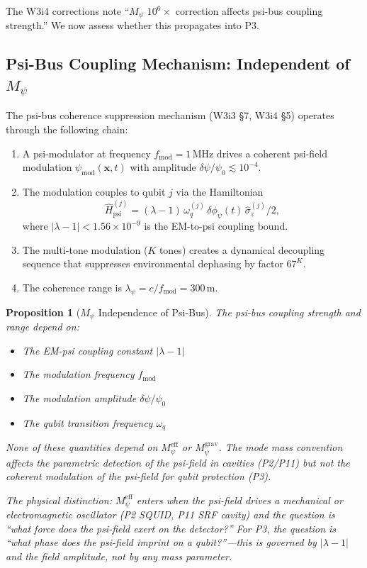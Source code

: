 \documentclass[11pt]{article}
\newtheorem{proposition}[theorem]{Proposition}
\theoremstyle{definition}
\theoremstyle{remark}
\begin{document}
The W3i4 corrections note ``$M_\psi$ $10^6\times$ correction affects psi-bus
coupling strength.''  We now assess whether this propagates into P3.

\subsection{Psi-Bus Coupling Mechanism: Independent of $M_\psi$}
\label{sec:coupling-mechanism}

The psi-bus coherence suppression mechanism (W3i3 \S7, W3i4 \S5) operates
through the following chain:

\begin{enumerate}
  \item A psi-modulator at frequency $f_{\mathrm{mod}} = 1$\,MHz drives a
    coherent psi-field modulation $\psi_{\mathrm{mod}}(\mathbf{x}, t)$ with
    amplitude $\delta\psi/\psi_0 \lesssim 10^{-4}$.

  \item The modulation couples to qubit $j$ via the Hamiltonian
    \begin{equation}
      \hat{H}_{\mathrm{psi}}^{(j)} = (\lambda-1)\,\omega_q^{(j)}\,
      \delta\phi_\psi(t)\,\hat{\sigma}_z^{(j)}/2,
      \label{eq:psi-qubit-hamiltonian}
    \end{equation}
    where $|\lambda - 1| < 1.56\times10^{-9}$ is the EM-to-psi coupling bound.

  \item The multi-tone modulation ($K$ tones) creates a dynamical decoupling
    sequence that suppresses environmental dephasing by factor $67^K$.

  \item The coherence range is $\lambda_\psi = c/f_{\mathrm{mod}} = 300$\,m.
\end{enumerate}

\begin{proposition}[$M_\psi$ Independence of Psi-Bus]
\label{prop:mpsi-independent}
The psi-bus coupling strength and range depend on:
\begin{itemize}
  \item The EM-psi coupling constant $|\lambda - 1|$
  \item The modulation frequency $f_{\mathrm{mod}}$
  \item The modulation amplitude $\delta\psi/\psi_0$
  \item The qubit transition frequency $\omega_q$
\end{itemize}
None of these quantities depend on $M_\psi^{\mathrm{eff}}$ or
$M_\psi^{\mathrm{grav}}$.  The mode mass convention affects the
\emph{parametric detection} of the psi-field in cavities (P2/P11)
but not the \emph{coherent modulation} of the psi-field for qubit
protection (P3).

The physical distinction: $M_\psi^{\mathrm{eff}}$ enters when the
psi-field drives a mechanical or electromagnetic oscillator (P2 SQUID,
P11 SRF cavity) and the question is ``what force does the psi-field
exert on the detector?''  For P3, the question is ``what phase does the
psi-field imprint on a qubit?''---this is governed by $|\lambda-1|$
and the field amplitude, not by any mass parameter.
\end{proposition}
\end{document}
